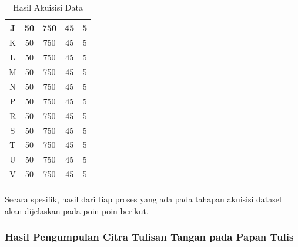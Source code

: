 \begin{center}
\begin{longtable}[c]{|c|c|c|c|c|}
    J              & 50           & 750         & 45         & 5         \\ \hline
    K              & 50           & 750         & 45         & 5         \\ \hline
    L              & 50           & 750         & 45         & 5         \\ \hline
    M              & 50           & 750         & 45         & 5         \\ \hline
    N              & 50           & 750         & 45         & 5         \\ \hline
    P              & 50           & 750         & 45         & 5         \\ \hline
    R              & 50           & 750         & 45         & 5         \\ \hline
    S              & 50           & 750         & 45         & 5         \\ \hline
    T              & 50           & 750         & 45         & 5         \\ \hline
    U              & 50           & 750         & 45         & 5         \\ \hline
    V              & 50           & 750         & 45         & 5         \\ \hline
    \caption{Hasil Akuisisi Data}
    \label{tb:hasilakuisisidata}\\
  \end{longtable}
\end{center}

Secara spesifik, hasil dari tiap proses yang ada pada tahapan akuisisi dataset akan dijelaskan pada poin-poin berikut. \par

\subsubsection{Hasil Pengumpulan Citra Tulisan Tangan pada Papan Tulis}
\label{subsubsec:hasilpengumpulancitra}

